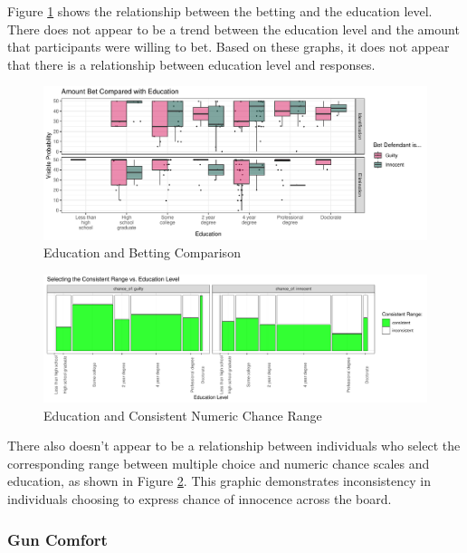\documentclass[print]{nuthesis}
\begin{document}
Figure \ref{fig:educbet} shows the relationship between the betting and the education level.
There does not appear to be a trend between the education level and the amount that participants were willing to bet.
Based on these graphs, it does not appear that there is a relationship between education level and responses.

\begin{figure}

{\centering \includegraphics[width=\linewidth]{thesis_files/figure-latex/educbet-1} 

}

\caption{Education and Betting Comparison}\label{fig:educbet}
\end{figure}

\begin{figure}

{\centering \includegraphics[width=\linewidth]{thesis_files/figure-latex/educrange-1} 

}

\caption{Education and Consistent Numeric Chance Range}\label{fig:educrange}
\end{figure}

There also doesn't appear to be a relationship between individuals who select the corresponding range between multiple choice and numeric chance scales and education, as shown in Figure \ref{fig:educrange}.
This graphic demonstrates inconsistency in individuals choosing to express chance of innocence across the board.

\hypertarget{gun-comfort}{%
\subsubsection{Gun Comfort}\label{gun-comfort}}
\end{document}
